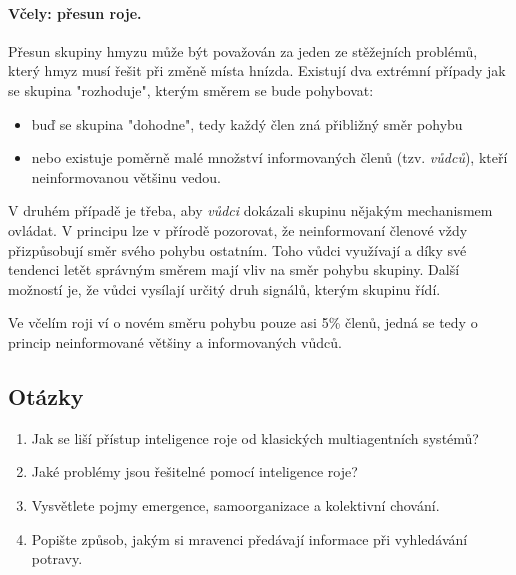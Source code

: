 \documentclass[a4paper,12pt]{article}
\begin{document}
\paragraph{Včely: přesun roje.}
Přesun skupiny hmyzu může být považován za jeden ze stěžejních problémů, který hmyz musí
řešit při změně místa hnízda. Existují dva extrémní případy jak se skupina "rozhoduje", kterým
směrem se bude pohybovat\cite{Blum08SwarmInt}:
\begin{itemize}
  \item buď se skupina "dohodne", tedy každý člen zná přibližný směr pohybu
  \item nebo existuje poměrně malé množství informovaných členů (tzv. {\it vůdců}), kteří
        neinformovanou většinu vedou.
\end{itemize}
V druhém případě je třeba, aby {\it vůdci} dokázali skupinu nějakým mechanismem ovládat. V principu
lze v přírodě pozorovat, že neinformovaní členové vždy přizpůsobují směr svého pohybu ostatním.
Toho vůdci využívají a díky své tendenci letět správným směrem mají vliv na směr pohybu skupiny.
Další možností je, že vůdci vysílají určitý druh signálů, kterým skupinu řídí.

Ve včelím roji ví o novém směru pohybu pouze asi 5\% členů, jedná se tedy o princip neinformované
většiny a informovaných vůdců.


\subsection{Otázky}
\begin{enumerate}
  \item Jak se liší přístup inteligence roje od klasických multiagentních systémů?
  \item Jaké problémy jsou řešitelné pomocí inteligence roje?
  \item Vysvětlete pojmy emergence, samoorganizace a kolektivní chování.
  \item Popište způsob, jakým si mravenci předávají informace při vyhledávání potravy.
\end{enumerate}

\newpage


\end{document}
